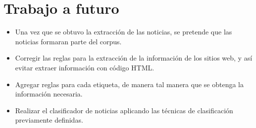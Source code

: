 \section{Trabajo a futuro}
\begin{itemize}
  \item Una vez que se obtuvo la extracción de las noticias, se pretende que las noticias formaran parte del corpus.
  \item Corregir las reglas para la extracción de la información de los sitios web, y así evitar extraer información con código HTML.
  \item Agregar reglas para cada etiqueta, de manera tal manera que se obtenga la información necesaria.
  \item Realizar el clasificador de noticias aplicando las técnicas de clasificación previamente definidas.
\end{itemize}
